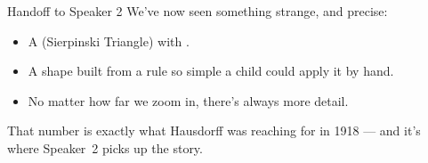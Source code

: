 \begin{frame}{Handoff to Speaker 2}
  \small
  We've now seen something strange, and precise:

  \begin{itemize}
    \item A  (Sierpinski Triangle) with
      .
    \item A shape built from a rule so simple a child could apply it
      by hand.
    \item No matter how far we zoom in, there's always more detail.
  \end{itemize}

  \pause
  \vspace{0.3cm}
  \begin{center}
  \end{center}

  \vspace{0.2cm}
  \pause
  That number is exactly what Hausdorff was reaching for in 1918 ---
  and it's where Speaker~2 picks up the story.
\end{frame}



